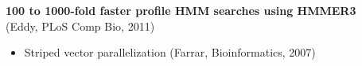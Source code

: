 \documentclass[landscape]{slides}
\begin{document}
\begin{slide}
\vfill 
\end{slide}
\begin{slide}
\begin{center}
\textbf{100 to 1000-fold faster profile HMM searches using HMMER3} \\
(Eddy, PLoS Comp Bio, 2011) 
\end{center}
\medskip

\small
\begin{itemize}
\item Striped vector parallelization (Farrar, Bioinformatics, 2007)
\end{itemize}

\vfill 
\end{slide}
\end{document}
